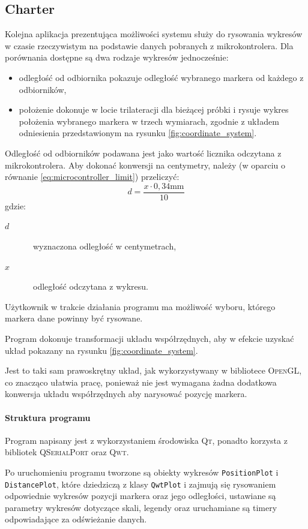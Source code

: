 \subsection{Charter}
Kolejna aplikacja prezentująca możliwości systemu służy do rysowania wykresów w czasie rzeczywistym na podstawie danych pobranych z mikrokontrolera. Dla porównania dostępne są dwa rodzaje wykresów jednocześnie:
\begin{itemize}
 \item odległość od odbiornika \ppauza pokazuje odległość wybranego markera od każdego z odbiorników,
 \item położenie \ppauza dokonuje w locie trilateracji dla bieżącej próbki i rysuje wykres położenia wybranego markera w trzech wymiarach, zgodnie z układem odniesienia przedstawionym na rysunku \ref{fig:coordinate_system}.
\end{itemize}

Odległość od odbiorników podawana jest jako wartość licznika odczytana z mikrokontrolera. Aby dokonać konwersji na centymetry, należy (w oparciu o równanie \ref{eq:microcontroller_limit}) przeliczyć:
\begin{equation}
 d = \frac{x \cdot 0,34\textrm{mm}}{10}
\end{equation}
gdzie:
\begin{description}
 \item[$d$] \ppauza~wyznaczona odległość w centymetrach,
 \item[$x$] \ppauza~odległość odczytana z wykresu.
\end{description}

Użytkownik w trakcie działania programu ma możliwość wyboru, którego markera dane powinny być rysowane.

Program dokonuje transformacji układu współrzędnych, aby w efekcie uzyskać układ pokazany na rysunku \ref{fig:coordinate_system}.

Jest to taki sam prawoskrętny układ, jak wykorzystywany w bibliotece \textsc{OpenGL}, co znacząco ułatwia pracę, ponieważ nie jest wymagana żadna dodatkowa konwersja układu współrzędnych aby narysować pozycję markera.

\paragraph{Struktura programu}
Program napisany jest z wykorzystaniem środowiska \textsc{Qt}, ponadto korzysta z bibliotek \textsc{QSerialPort} oraz \textsc{Qwt}.

Po uruchomieniu programu tworzone są obiekty wykresów \verb|PositionPlot| i \verb|DistancePlot|, które dziedziczą z klasy \verb|QwtPlot| i zajmują się rysowaniem odpowiednie wykresów pozycji markera oraz jego odległości, ustawiane są parametry wykresów dotyczące skali, legendy oraz uruchamiane są timery odpowiadające za odświeżanie danych.

